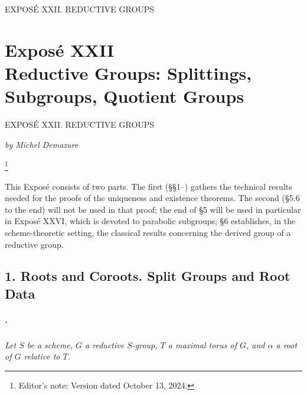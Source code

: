 
  {EXPOSÉ XXII. REDUCTIVE GROUPS}

\setcounter{footnote}{0}
\chapter*{Exposé XXII\\
Reductive Groups: Splittings, Subgroups, Quotient Groups}
  {EXPOSÉ XXII. REDUCTIVE GROUPS}

\begin{center}
  \textit{by Michel Demazure}
\end{center}

\begingroup
\renewcommand{\thefootnote}{0}
\footnote{Editor's note: Version dated October 13, 2024.}
\addtocounter{footnote}{-1}
\endgroup
This Exposé consists of two parts. The first (\S\S1--) gathers the
technical results needed for the proofs of the uniqueness and
existence theorems. The second (\S5.6 to the end) will not be used in
that proof; the end of \S5 will be used in particular in Exposé XXVI,
which is devoted to parabolic subgroups; \S6 establishes, in the
scheme-theoretic setting, the classical results concerning the
derived group of a reductive group.

\section*{1. Roots and Coroots.
Split Groups and Root Data}

\paragraph{.}
\textit{Let \(S\) be a scheme, \(G\) a reductive \(S\)-group,
\(T\) a maximal torus of \(G\), and \(\alpha\) a root of \(G\)
relative to \(T\).}

